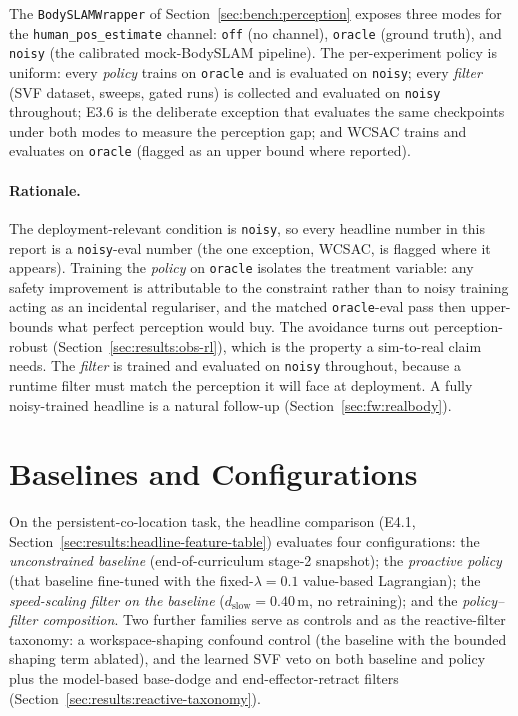 \documentclass[11pt,a4paper]{report}
\newcommand{\bodyslampp}{BodySLAM\nolinebreak[4]\hspace{-.05em}\raisebox{.2ex}{\scriptsize ++}}
\begin{document}
The \texttt{BodySLAMWrapper} of Section~\ref{sec:bench:perception}
exposes three modes for the \texttt{human\_pos\_estimate} channel:
\texttt{off} (no channel), \texttt{oracle} (ground truth), and
\texttt{noisy} (the calibrated mock-\bodyslampp{} pipeline). The
per-experiment policy is uniform: every \emph{policy} trains on
\texttt{oracle} and is evaluated on \texttt{noisy}; every
\emph{filter} (SVF dataset, sweeps, gated runs) is collected and
evaluated on \texttt{noisy} throughout; E3.6 is the deliberate
exception that evaluates the same checkpoints under both modes to
measure the perception gap; and WCSAC trains and evaluates on
\texttt{oracle} (flagged as an upper bound where reported).

\paragraph{Rationale.}
The deployment-relevant condition is \texttt{noisy}, so every
headline number in this report is a \texttt{noisy}-eval number (the
one exception, WCSAC, is flagged where it appears). Training the
\emph{policy} on \texttt{oracle} isolates the treatment variable:
any safety improvement is attributable to the constraint rather
than to noisy training acting as an incidental regulariser, and the
matched \texttt{oracle}-eval pass then upper-bounds what perfect
perception would buy. The avoidance turns out perception-robust
(Section~\ref{sec:results:obs-rl}), which is the property a
sim-to-real claim needs. The \emph{filter} is trained and evaluated
on \texttt{noisy} throughout, because a runtime filter must match
the perception it will face at deployment. A fully noisy-trained
headline is a natural follow-up (Section~\ref{sec:fw:realbody}).

\section{Baselines and Configurations}
\label{sec:setup:baselines}

On the persistent-co-location task, the headline comparison (E4.1,
Section~\ref{sec:results:headline-feature-table}) evaluates four
configurations: the \emph{unconstrained baseline}
(end-of-curriculum stage-2 snapshot); the \emph{proactive policy}
(that baseline fine-tuned with the fixed-$\lambda = 0.1$
value-based Lagrangian); the \emph{speed-scaling filter on the
baseline} ($d_{\mathrm{slow}} = 0.40$\,m, no retraining); and the
\emph{policy--filter composition}. Two further families serve as
controls and as the reactive-filter taxonomy: a workspace-shaping
confound control (the baseline with the bounded shaping term
ablated), and the learned SVF veto on both baseline and policy plus
the model-based base-dodge and end-effector-retract filters
(Section~\ref{sec:results:reactive-taxonomy}).
\end{document}
